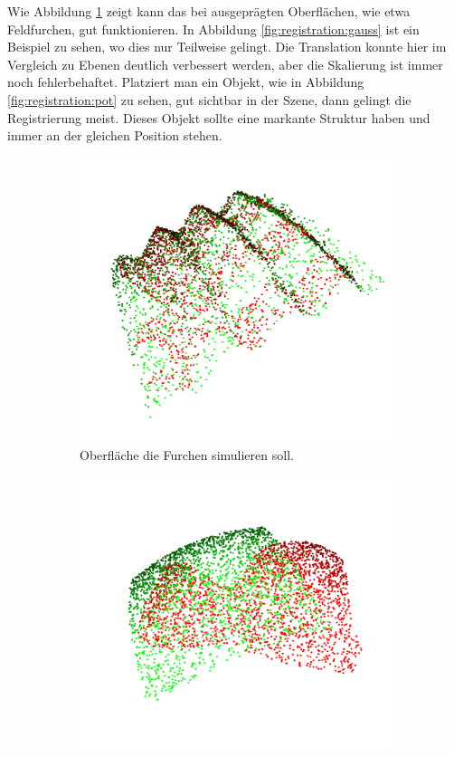 \documentclass[12pt,titlepage, twoside]{article}
\begin{document}
Wie Abbildung \ref{fig:registration:sinus} zeigt kann das bei ausgeprägten Oberflächen, wie etwa Feldfurchen, gut funktionieren. 
In Abbildung \ref{fig:registration:gauss} ist ein Beispiel zu sehen, wo dies nur Teilweise gelingt. Die Translation konnte hier im Vergleich zu Ebenen deutlich verbessert werden, aber die Skalierung ist immer noch fehlerbehaftet.
Platziert man ein Objekt, wie in Abbildung \ref{fig:registration:pot} zu sehen, gut sichtbar in der Szene, dann gelingt die Registrierung meist. 
Dieses Objekt sollte eine markante Struktur haben und immer an der gleichen Position stehen.

\begin{figure}[htb]
    \centering 
\begin{subfigure}{0.3\textwidth}
  \includegraphics[width=\linewidth]{./Images/Registration_Sinus.png}
  \caption{Oberfläche die Furchen simulieren soll.}
  \label{fig:registration:sinus}
\end{subfigure}\hfil
\begin{subfigure}{0.3\textwidth}
  \includegraphics[width=\linewidth]{./Images/Registration_Gauss.png}

\end{subfigure}
\end{figure}
\end{document}

